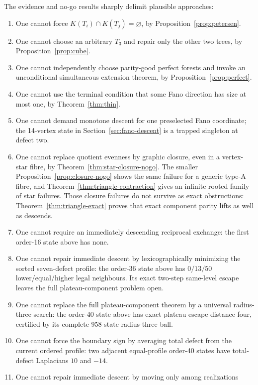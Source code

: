 \documentclass[11pt]{article}
\theoremstyle{definition}
\theoremstyle{remark}
\newcommand{\1}{\mathbf 1}
\begin{document}
The evidence and no-go results sharply delimit plausible approaches:
\begin{enumerate}
\item One cannot force \(K(T_i)\cap K(T_j)=\varnothing\), by
      Proposition~\ref{prop:petersen}.
\item One cannot choose an arbitrary \(T_3\) and repair only the other two
      trees, by Proposition~\ref{prop:cube}.
\item One cannot independently choose parity-good perfect forests and
      invoke an unconditional simultaneous extension theorem, by
      Proposition~\ref{prop:perfect}.
\item One cannot use the terminal condition that some Fano direction has
      size at most one, by Theorem~\ref{thm:thin}.
\item One cannot demand monotone descent for one preselected Fano
      coordinate; the 14-vertex state in
      Section~\ref{sec:fano-descent} is a trapped singleton at defect two.
\item One cannot replace quotient evenness by graphic closure, even in a
      vertex-star fibre, by Theorem~\ref{thm:star-closure-nogo}.  The
      smaller Proposition~\ref{prop:closure-nogo} shows the same failure
      for a generic type-A fibre, and
      Theorem~\ref{thm:triangle-contraction} gives an infinite rooted
      family of star failures.  Those closure failures do not survive as
      exact obstructions: Theorem~\ref{thm:triangle-exact} proves that
      exact component parity lifts as well as descends.
\item One cannot require an immediately descending reciprocal exchange:
      the first order-16 state above has none.
\item One cannot repair immediate descent by lexicographically minimizing
      the sorted seven-defect profile: the order-36 state above has
      \(0/13/50\) lower/equal/higher legal neighbours.  Its exact two-step
      same-level escape leaves the full plateau-component problem open.
\item One cannot replace the full plateau-component theorem by a universal
      radius-three search: the order-40 state above has exact plateau escape
      distance four, certified by its complete 958-state radius-three ball.
\item One cannot force the boundary sign by averaging total defect from the
      current ordered profile: two adjacent equal-profile order-40 states
      have total-defect Laplacians \(10\) and \(-14\).
\item One cannot repair immediate descent by moving only among realizations

\end{enumerate}
\end{document}
